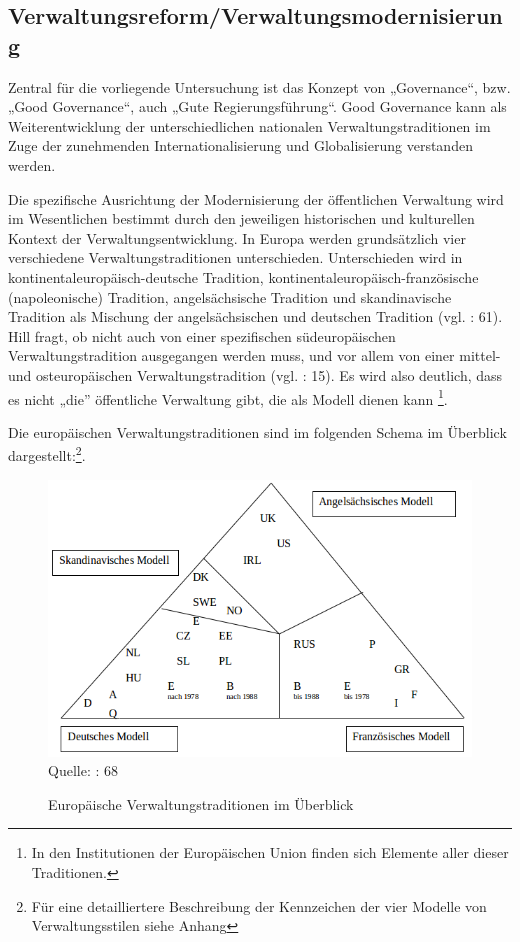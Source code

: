 \subsection{Verwaltungsreform/Verwaltungsmodernisierung }
Zentral für die vorliegende Untersuchung ist das Konzept von „Governance“, bzw. „Good Governance“, auch „Gute Regierungsführung“. Good Governance kann als Weiterentwicklung der unterschiedlichen nationalen Verwaltungstraditionen im Zuge der zunehmenden Internationalisierung und Globalisierung verstanden werden.
\par
Die spezifische Ausrichtung der Modernisierung der öffentlichen Verwaltung wird im Wesentlichen bestimmt durch den jeweiligen historischen und kulturellen Kontext der Verwaltungsentwicklung. In Europa werden grundsätzlich vier verschiedene Verwaltungstraditionen unterschieden. Unterschieden wird in kontinentaleuropäisch-deutsche Tradition, kontinentaleuropäisch-französische (napoleonische) Tradition, angelsächsische Tradition und skandinavische Tradition als Mischung der angelsächsischen und deutschen Tradition (vgl. \cite{lipumb05}: 61). Hill fragt, ob nicht auch von einer spezifischen südeuropäischen Verwaltungstradition ausgegangen werden muss, und vor allem von einer mittel- und osteuropäischen Verwaltungstradition (vgl. \cite{hill06}: 15). Es wird also deutlich, dass es nicht „die” öffentliche Verwaltung gibt, die als Modell dienen kann \footnote{In den Institutionen der Europäischen Union finden sich Elemente aller dieser Traditionen.}.
\par
Die europäischen Verwaltungstraditionen sind im folgenden Schema im Überblick dargestellt:\footnote{Für eine detailliertere Beschreibung der Kennzeichen der vier Modelle von Verwaltungsstilen siehe Anhang }.
\begin{figure}[H]
  \caption{Europäische Verwaltungstraditionen im Überblick}
  \centering
  \includegraphics[width=5in]{Material/VerwaltungsModelle}\\
\scriptsize{Quelle: \cite{lipumb05}: 68}
\end{figure}

